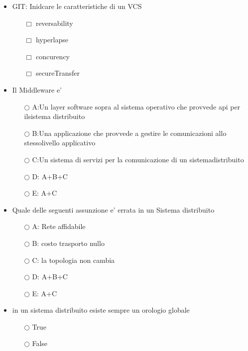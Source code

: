 \documentclass[10pt,twocolumn]{article}
\begin{document}
\begin{itemize}
    \item GIT: Inidcare le caratteristiche di un VCS
          \begin{itemize}
              \item[$\Box$] reversability
              \item[$\Box$] hyperlapse
              \item[$\Box$] concurency
              \item[$\Box$] secureTransfer
          \end{itemize}
\end{itemize}
\begin{itemize}
    \item Il Middleware e'
          \begin{itemize}
              \item[$\bigcirc$] A:Un layer software sopra al sistema operativo che provvede api per ilsistema distribuito
              \item[$\bigcirc$] B:Una applicazione che provvede a gestire le comunicazioni allo stessolivello applicativo
              \item[$\bigcirc$] C:Un sistema di servizi per la comunicazione di un sistemadistribuito
              \item[$\bigcirc$] D: A+B+C
              \item[$\bigcirc$] E: A+C
          \end{itemize}
\end{itemize}
\begin{itemize}
    \item Quale delle seguenti assunzione e' errata in un Sistema distribuito
          \begin{itemize}
              \item[$\bigcirc$] A: Rete affidabile
              \item[$\bigcirc$] B: costo trasporto nullo
              \item[$\bigcirc$] C: la topologia non cambia
              \item[$\bigcirc$] D: A+B+C
              \item[$\bigcirc$] E: A+C
          \end{itemize}
\end{itemize}
\begin{itemize}
    \item in un sistema distribuito esiste sempre un orologio globale
          \begin{itemize}
              \item[$\bigcirc$] True
              \item[$\bigcirc$] False
          \end{itemize}
\end{itemize}
\end{document}
